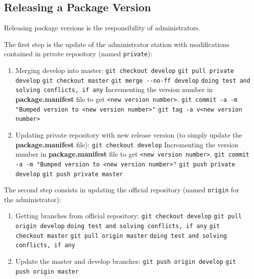 \documentclass[12pt,a4paper]{article}
\begin{document}
\subsection{Releasing a Package Version}

Releasing package versions is the responsibility of administrators.

The first step is the update of the administrator station with modifications contained in private repository (named \texttt{private}):
\begin{enumerate}
\item Merging develop into master:
\linebreak \verb|git checkout develop|
\linebreak \verb|git pull private develop|
\linebreak \verb|git checkout master|
\linebreak \verb|git merge --no-ff develop|
\linebreak \verb|doing test and solving conflicts, if any|
\linebreak Incrementing the version number in \textbf{package.manifest} file to get \texttt{<new version number>}.
\linebreak \verb|git commit -a -m "Bumped version to <new version number>"|
\linebreak \verb|git tag -a v<new version number>|
\item Updating private repository with new release version (to simply update the \textbf{package.manifest} file):
\linebreak \verb|git checkout develop|
\linebreak Incrementing the version number in \textbf{package.manifest} file to get \texttt{<new version number>}.
\linebreak \verb|git commit -a -m "Bumped version to <new version number>"|
\linebreak \verb|git push private develop|
\linebreak \verb|git push private master|
\end{enumerate}

The second step consists in updating the official repository (named \texttt{origin} for the administrator):
\begin{enumerate}
\item Getting branches from official repository:
\linebreak \verb|git checkout develop|
\linebreak \verb|git pull origin develop|
\linebreak \verb|doing test and solving conflicts, if any|
\linebreak \verb|git checkout master|
\linebreak \verb|git pull origin master|
\linebreak \verb|doing test and solving conflicts, if any|
\item Update the master and develop branches:
\linebreak \verb|git push origin develop|
\linebreak \verb|git push origin master|
\end{enumerate}
\end{document}
